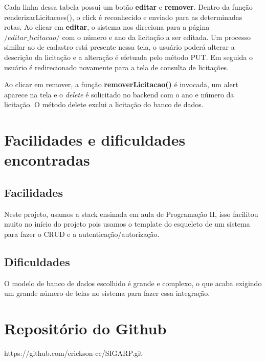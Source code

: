 \documentclass[ ]{article}
\begin{document}
		Cada linha dessa tabela possui um botão \textbf{editar} e \textbf{remover}.		 Dentro da função renderizarLicitacoes(), o click é reconhecido e enviado para as determinadas rotas. Ao clicar em \textbf{editar}, o sistema nos direciona para a página $/editar\_licitacao/$ com o número e ano da licitação a ser editada. Um processo similar ao de cadastro está presente nessa tela, o usuário poderá alterar a descrição da licitação e a alteração é efetuada pelo método PUT. Em seguida o usuário é redirecionado novamente para a tela de consulta de licitações.
		
		Ao clicar em remover, a função \textbf{removerLicitacao()} é invocada, um alert aparece na tela e o \textit{delete} é solicitado no backend com o ano e número da licitação. O método delete exclui a licitação do banco de dados.
	\section{Facilidades e dificuldades encontradas}
		\subsection{Facilidades}
			Neste projeto, usamos a stack ensinada em aula de Programação II, isso facilitou muito no início do projeto pois usamos o template do esqueleto de um sistema para fazer o CRUD e a autenticação/autorização.
		\subsection{Dificuldades}
			O modelo de banco de dados escolhido é grande e complexo, o que acaba exigindo um grande número de telas no sistema para fazer essa integração.
	\section{Repositório do Github}
	https://github.com/erickson-cc/SIGARP.git
	
\end{document}
